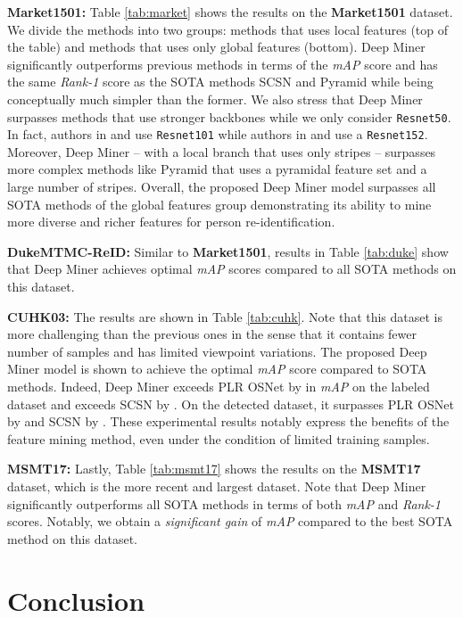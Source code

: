 \documentclass[final]{cvpr}
\begin{document}
\textbf{Market1501:} Table \ref{tab:market} shows the results on the \textbf{Market1501} dataset.  We divide the methods into two groups: methods that uses local features (top of the table) and methods that uses only global features (bottom). Deep Miner significantly outperforms previous methods in terms of the \textit{mAP} score and has the same \textit{Rank-1} score as the SOTA methods SCSN and Pyramid while being conceptually much simpler than the former.
We also stress that Deep Miner surpasses methods that use stronger backbones while we only consider \texttt{Resnet50}. In fact, authors  in \cite{zheng2019pyramidal} and \cite{alemu2019deep} use \texttt{Resnet101} while authors in \cite{tay2019aanet} and \cite{kalayeh2018human} use a \texttt{Resnet152}. Moreover, Deep Miner -- with a local branch that uses only  stripes -- surpasses more complex methods like Pyramid that uses a pyramidal feature set and a large number of stripes. Overall, the proposed Deep Miner model surpasses all SOTA methods of the global features group demonstrating its ability to mine more diverse and richer features for person re-identification. 

\textbf{DukeMTMC-ReID:} Similar to \textbf{Market1501}, results in Table \ref{tab:duke} show that Deep Miner achieves optimal \textit{mAP} scores compared to all SOTA methods on this dataset. 



\textbf{CUHK03:} The results are shown in Table \ref{tab:cuhk}.
Note that this dataset is more challenging than the previous ones in the sense that it contains fewer number of samples and has limited viewpoint variations. 
The proposed Deep Miner model is shown to achieve the optimal \textit{mAP} score compared to SOTA methods. Indeed, Deep Miner exceeds PLR OSNet by  in \textit{mAP} on the labeled dataset and exceeds SCSN by . On the detected dataset, it surpasses PLR OSNet by  and SCSN by . 
These experimental results notably express the benefits of the feature mining method, even under the condition of limited training samples.

\textbf{MSMT17:} Lastly, Table \ref{tab:msmt17} shows the results on the \textbf{MSMT17} dataset, which is the more recent and largest dataset. Note that Deep Miner significantly outperforms all SOTA methods in terms of both \textit{mAP} and \textit{Rank-1} scores. Notably, we obtain a \textit{significant gain} of  \textit{mAP} compared to the best SOTA method on this dataset.

\section{Conclusion}
\end{document}

